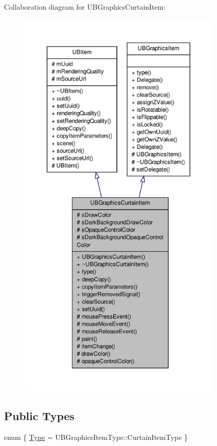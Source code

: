 Collaboration diagram for U\-B\-Graphics\-Curtain\-Item\-:
\nopagebreak
\begin{figure}[H]
\begin{center}
\leavevmode
\includegraphics[height=550pt]{d8/dfe/class_u_b_graphics_curtain_item__coll__graph}
\end{center}
\end{figure}
\subsection*{Public Types}
\begin{DoxyCompactItemize}
\item 
enum \{ \hyperlink{class_u_b_graphics_curtain_item_a00db4517e5f1c171ceea483a39719223a06dafce4af45da8ae1847703ee523039}{Type} =  U\-B\-Graphics\-Item\-Type\-:\-:Curtain\-Item\-Type
 \}
\end{DoxyCompactItemize}

